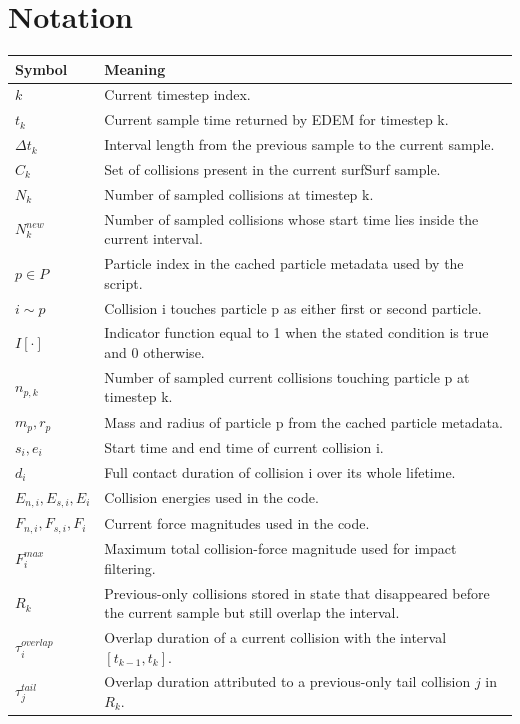 \documentclass[11pt,a4paper]{article}
\begin{document}
\section*{Notation}
\begin{longtable}{@{}L{0.22\textwidth}L{0.70\textwidth}@{}}
\toprule
\textbf{Symbol} & \textbf{Meaning}\\
\midrule
\endhead
$k$ & Current timestep index.\\
$t_k$ & Current sample time returned by EDEM for timestep k.\\
$\Delta t_k$ & Interval length from the previous sample to the current sample.\\
$C_k$ & Set of collisions present in the current surfSurf sample.\\
$N_k$ & Number of sampled collisions at timestep k.\\
$N_k^{new}$ & Number of sampled collisions whose start time lies inside the current interval.\\
$p \in P$ & Particle index in the cached particle metadata used by the script.\\
$i \sim p$ & Collision i touches particle p as either first or second particle.\\
$I[\cdot]$ & Indicator function equal to 1 when the stated condition is true and 0 otherwise.\\
$n_{p,k}$ & Number of sampled current collisions touching particle p at timestep k.\\
$m_p, r_p$ & Mass and radius of particle p from the cached particle metadata.\\
$s_i, e_i$ & Start time and end time of current collision i.\\
$d_i$ & Full contact duration of collision i over its whole lifetime.\\
$E_{n,i}, E_{s,i}, E_i$ & Collision energies used in the code.\\
$F_{n,i}, F_{s,i}, F_i$ & Current force magnitudes used in the code.\\
$F_i^{max}$ & Maximum total collision-force magnitude used for impact filtering.\\
$R_k$ & Previous-only collisions stored in state that disappeared before the current sample but still overlap the interval.\\
$\tau_i^{overlap}$ & Overlap duration of a current collision with the interval $[t_{k-1}, t_k]$.\\
$\tau_j^{tail}$ & Overlap duration attributed to a previous-only tail collision $j$ in $R_k$.\\

\end{longtable}
\end{document}
